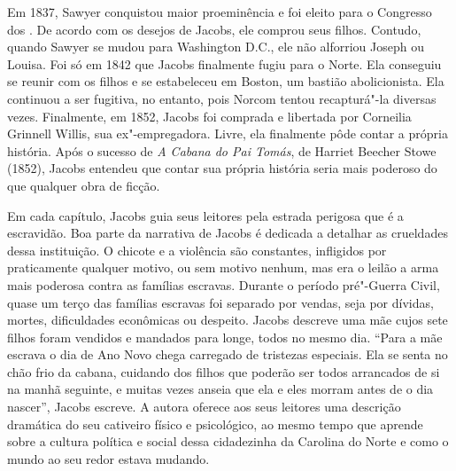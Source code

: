 Em 1837, Sawyer conquistou maior proeminência e foi eleito para o
Congresso dos . De acordo com os desejos de Jacobs, ele comprou seus
filhos. Contudo, quando Sawyer se mudou para Washington D.C., ele não
alforriou Joseph ou Louisa. Foi só em 1842 que Jacobs finalmente fugiu
para o Norte. Ela conseguiu se reunir com os filhos e se estabeleceu em
Boston, um bastião abolicionista. Ela continuou a ser fugitiva, no
entanto, pois Norcom tentou recapturá"-la diversas vezes. Finalmente, em
1852, Jacobs foi comprada e libertada por Corneilia Grinnell Willis, sua
ex"-empregadora. Livre, ela finalmente pôde contar a própria história.
Após o sucesso de \emph{A Cabana do Pai Tomás}, de Harriet Beecher Stowe
(1852), Jacobs entendeu que contar sua própria história seria mais
poderoso do que qualquer obra de ficção.

Em cada capítulo, Jacobs guia seus leitores pela estrada perigosa que é
a escravidão. Boa parte da narrativa de Jacobs é dedicada a detalhar as
crueldades dessa instituição. O chicote e a violência são constantes,
infligidos por praticamente qualquer motivo, ou sem motivo nenhum, mas
era o leilão a arma mais poderosa contra as famílias escravas.
Durante o período pré"-Guerra Civil, quase um terço das famílias escravas
foi separado por vendas, seja por dívidas,
mortes, dificuldades econômicas ou despeito. Jacobs descreve uma mãe
cujos sete filhos foram vendidos e mandados para longe, todos no mesmo
dia. ``Para a mãe escrava o dia de Ano Novo chega carregado de tristezas
especiais. Ela se senta no chão frio da cabana, cuidando dos filhos que
poderão ser todos arrancados de si na manhã seguinte, e muitas vezes
anseia que ela e eles morram antes de o dia nascer'', Jacobs escreve. A
autora oferece aos seus leitores uma descrição dramática do seu
cativeiro físico e psicológico, ao mesmo tempo que aprende sobre a
cultura política e social dessa cidadezinha da Carolina do Norte e como
o mundo ao seu redor estava mudando.

